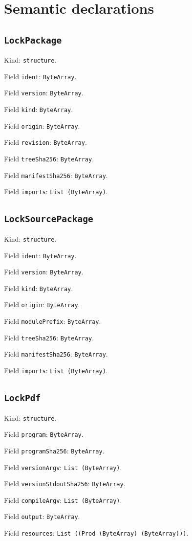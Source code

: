 \documentclass[11pt]{article}
\begin{document}
\section*{Semantic declarations}
\subsection*{\texttt{LockPackage}}
\noindent Kind: \texttt{structure}.\par
\noindent Field \texttt{ident}: \texttt{ByteArray}.\par
\noindent Field \texttt{version}: \texttt{ByteArray}.\par
\noindent Field \texttt{kind}: \texttt{ByteArray}.\par
\noindent Field \texttt{origin}: \texttt{ByteArray}.\par
\noindent Field \texttt{revision}: \texttt{ByteArray}.\par
\noindent Field \texttt{treeSha256}: \texttt{ByteArray}.\par
\noindent Field \texttt{manifestSha256}: \texttt{ByteArray}.\par
\noindent Field \texttt{imports}: \texttt{List (ByteArray)}.\par
\subsection*{\texttt{LockSourcePackage}}
\noindent Kind: \texttt{structure}.\par
\noindent Field \texttt{ident}: \texttt{ByteArray}.\par
\noindent Field \texttt{version}: \texttt{ByteArray}.\par
\noindent Field \texttt{kind}: \texttt{ByteArray}.\par
\noindent Field \texttt{origin}: \texttt{ByteArray}.\par
\noindent Field \texttt{modulePrefix}: \texttt{ByteArray}.\par
\noindent Field \texttt{treeSha256}: \texttt{ByteArray}.\par
\noindent Field \texttt{manifestSha256}: \texttt{ByteArray}.\par
\noindent Field \texttt{imports}: \texttt{List (ByteArray)}.\par
\subsection*{\texttt{LockPdf}}
\noindent Kind: \texttt{structure}.\par
\noindent Field \texttt{program}: \texttt{ByteArray}.\par
\noindent Field \texttt{programSha256}: \texttt{ByteArray}.\par
\noindent Field \texttt{versionArgv}: \texttt{List (ByteArray)}.\par
\noindent Field \texttt{versionStdoutSha256}: \texttt{ByteArray}.\par
\noindent Field \texttt{compileArgv}: \texttt{List (ByteArray)}.\par
\noindent Field \texttt{output}: \texttt{ByteArray}.\par
\noindent Field \texttt{resources}: \texttt{List ((Prod (ByteArray) (ByteArray)))}.\par
\end{document}
